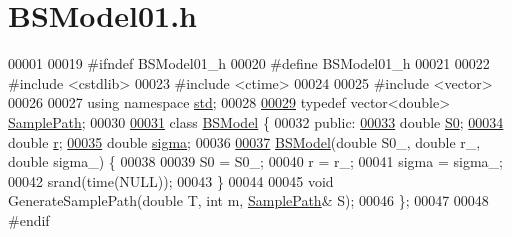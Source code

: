 \hypertarget{BSModel01_8h_source}{\section{B\+S\+Model01.\+h}
}

\begin{DoxyCode}
00001 
00019 \textcolor{preprocessor}{#ifndef BSModel01\_h}
00020 \textcolor{preprocessor}{#define BSModel01\_h}
00021 
00022 \textcolor{preprocessor}{#include <cstdlib>}
00023 \textcolor{preprocessor}{#include <ctime>}
00024 
00025 \textcolor{preprocessor}{#include <vector>}
00026 
00027 \textcolor{keyword}{using namespace }\hyperlink{namespacestd}{std};
00028 
\hypertarget{BSModel01_8h_source_l00029}{}\hyperlink{BSModel01_8h_afbb1a5715857075c187084894fc00d31}{00029} \textcolor{keyword}{typedef} vector<double> \hyperlink{BSModel01_8h_afbb1a5715857075c187084894fc00d31}{SamplePath};
00030 
\hypertarget{BSModel01_8h_source_l00031}{}\hyperlink{classBSModel}{00031} \textcolor{keyword}{class }\hyperlink{classBSModel}{BSModel} \{
00032   \textcolor{keyword}{public}:
\hypertarget{BSModel01_8h_source_l00033}{}\hyperlink{classBSModel_a2b37a14d9aaab033d676dd16381f7f19}{00033}     \textcolor{keywordtype}{double} \hyperlink{classBSModel_a2b37a14d9aaab033d676dd16381f7f19}{S0};
\hypertarget{BSModel01_8h_source_l00034}{}\hyperlink{classBSModel_add3230c0df8e47623116b439598c0de3}{00034}     \textcolor{keywordtype}{double} \hyperlink{classBSModel_add3230c0df8e47623116b439598c0de3}{r};
\hypertarget{BSModel01_8h_source_l00035}{}\hyperlink{classBSModel_a1267641043c16cd9baf2eb242320f0d3}{00035}     \textcolor{keywordtype}{double} \hyperlink{classBSModel_a1267641043c16cd9baf2eb242320f0d3}{sigma};
00036 
\hypertarget{BSModel01_8h_source_l00037}{}\hyperlink{classBSModel_a309dd895251cfd050b2d50a30abfc5fb}{00037}     \hyperlink{classBSModel_a309dd895251cfd050b2d50a30abfc5fb}{BSModel}(\textcolor{keywordtype}{double} S0\_, \textcolor{keywordtype}{double} r\_, \textcolor{keywordtype}{double} sigma\_) \{
00038 
00039       S0 = S0\_;
00040       r = r\_;
00041       sigma = sigma\_;
00042       srand(time(NULL));
00043     \}
00044 
00045     \textcolor{keywordtype}{void} GenerateSamplePath(\textcolor{keywordtype}{double} T, \textcolor{keywordtype}{int} m, \hyperlink{BSModel01_8h_afbb1a5715857075c187084894fc00d31}{SamplePath}& S);
00046 \};
00047 
00048 \textcolor{preprocessor}{#endif}
\end{DoxyCode}

